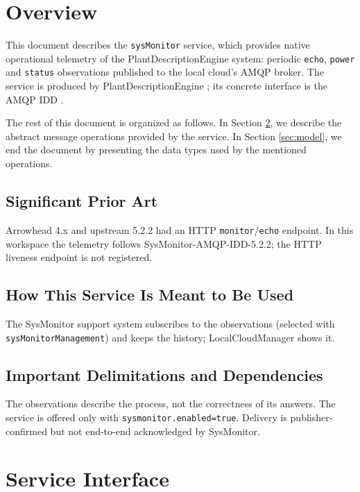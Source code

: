 \documentclass[a4paper]{arrowhead}
\begin{document}
\section{Overview}
\label{sec:overview}

This document describes the \texttt{sysMonitor} service, which provides native operational telemetry of the Plant\allowbreak{}Description\allowbreak{}Engine system: periodic \texttt{echo}, \texttt{power} and \texttt{status} observations published to the local cloud's AMQP broker.
The service is produced by PlantDescriptionEngine \cite{pde-sysd}; its concrete interface is the AMQP IDD \cite{pde-sysMonitor-amqp-idd}.

The rest of this document is organized as follows.
In Section \ref{sec:operations}, we describe the abstract message operations provided by the service.
In Section \ref{sec:model}, we end the document by presenting the data types used by the mentioned operations.

\subsection{Significant Prior Art}

Arrowhead 4.x and upstream 5.2.2 had an HTTP \texttt{monitor}/\texttt{echo} endpoint. In this workspace the telemetry follows SysMonitor-AMQP-IDD-5.2.2; the HTTP liveness endpoint is not registered.

\subsection{How This Service Is Meant to Be Used}

The SysMonitor support system subscribes to the observations (selected with \texttt{sys\allowbreak{}Monitor\allowbreak{}Management}) and keeps the history; LocalCloudManager shows it.

\subsection{Important Delimitations and Dependencies}
\label{sec:delimitations}

The observations describe the process, not the correctness of its answers. The service is offered only with \texttt{sysmonitor.\allowbreak{}enabled=\allowbreak{}true}. Delivery is publisher-confirmed but not end-to-end acknowledged by SysMonitor.

\newpage

\section{Service Interface}
\label{sec:operations}
\end{document}
